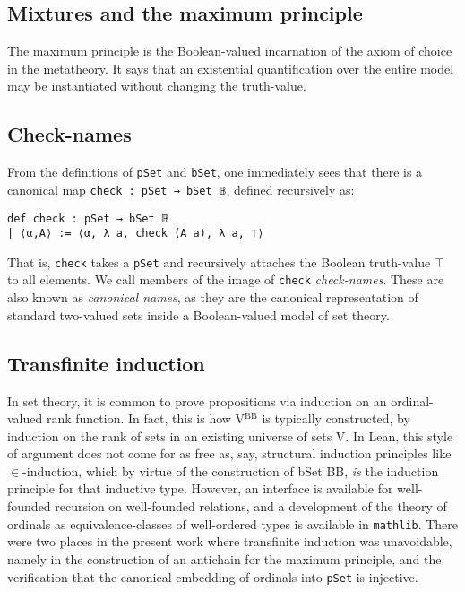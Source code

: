 \documentclass[a4paper,USenglish,cleveref, autoref]{lipics-v2019}
\newcommand{\lil}{\lstinline}
\begin{document}
\subsection{Mixtures and the maximum principle}

The maximum principle is the Boolean-valued incarnation of the axiom of choice in the metatheory. It says that an existential quantification over the entire model may be instantiated without changing the truth-value.

\subsection{Check-names}


From the definitions of \lil{pSet} and \lil{bSet}, one immediately sees that there is a canonical map \lil{check : pSet → bSet 𝔹}, defined recursively as:
\begin{lstlisting}
def check : pSet → bSet 𝔹
| ⟨α,A⟩ := ⟨α, λ a, check (A a), λ a, ⊤⟩
\end{lstlisting}

That is, \lil{check} takes a \lil{pSet} and recursively attaches the Boolean truth-value $\top$ to all elements. We call members of the image of \lil{check} \emph{check-names}. These are also known as \emph{canonical names}, as they are the canonical representation of standard two-valued sets inside a Boolean-valued model of set theory.

\subsection{Transfinite induction}
\label{sec:org9e70de8}
In set theory, it is common to prove propositions via induction on an ordinal-valued rank function. In fact, this is how V\(^{\text{BB}}\) is typically constructed, by induction on the rank of sets in an existing universe of sets V. In Lean, this style of argument does not come for as free as, say, structural induction principles like $\in$-induction, which by virtue of the construction of bSet BB, \emph{is} the induction principle for that inductive type. However, an interface is available for well-founded recursion on well-founded relations, and a development of the theory of ordinals as equivalence-classes of well-ordered types is available in \texttt{mathlib}. There were two places in the present work where transfinite induction was unavoidable, namely in the construction of an antichain for the maximum principle, and the verification that the canonical embedding of ordinals into \texttt{pSet} is injective.
\end{document}
